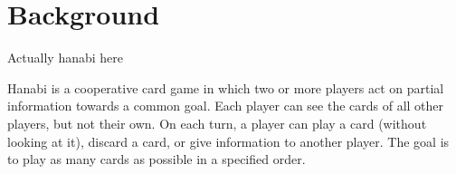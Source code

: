 \section{Background}
\label{background}

Actually hanabi here

Hanabi \cite{hanabiboardgame, hanabiwiki} is a cooperative card game in which two or more players act on partial information towards a common goal. Each player can see the cards of all other players, but not their own. On each turn, a player can play a card (without looking at it), discard a card, or give information to another player. The goal is to play as many cards as possible in a specified order.



